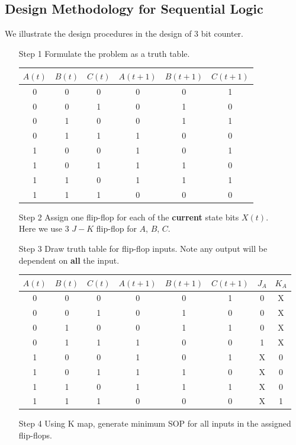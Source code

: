 \documentclass[12pt]{article}
\theoremstyle{definition}
\begin{document}
\subsection{Design Methodology for Sequential Logic}
We illustrate the design procedures in the design of 3 bit counter.
\begin{itemize}
  \item[Step 1]Formulate the problem as a truth table.
  \begin{table}[h]
  \centering
  \begin{tabular}{|c|c|c||c|c|c|}
  \hline
  $A(t)$&$B(t)$&$C(t)$&$A(t+1)$&$B(t+1)$&$C(t+1)$\\\hline
  0&0&0&0&0&1\\\hline
  0&0&1&0&1&0\\\hline
  0&1&0&0&1&1\\\hline
  0&1&1&1&0&0\\\hline
  1&0&0&1&0&1\\\hline
  1&0&1&1&1&0\\\hline
  1&1&0&1&1&1\\\hline
  1&1&1&0&0&0\\\hline
  \end{tabular}
  \end{table}
  \item[Step 2]Assign one flip-flop for each of the \textbf{current} state bits $X(t)$.\\Here we use 3 $J-K$ flip-flop for $A$, $B$, $C$.
  \item[Step 3]Draw truth table for flip-flop inputs. Note any output will be dependent on \textbf{all} the input.\clearpage
  \begin{table}[h]
  \centering
  \begin{tabular}{|c|c|c||c|c|c|c|c|}
  \hline
  $A(t)$&$B(t)$&$C(t)$&$A(t+1)$&$B(t+1)$&$C(t+1)$&$J_A$&$K_A$\\\hline
  0&0&0&0&0&1&0&X\\\hline
  0&0&1&0&1&0&0&X\\\hline
  0&1&0&0&1&1&0&X\\\hline
  0&1&1&1&0&0&1&X\\\hline
  1&0&0&1&0&1&X&0\\\hline
  1&0&1&1&1&0&X&0\\\hline
  1&1&0&1&1&1&X&0\\\hline
  1&1&1&0&0&0&X&1\\\hline
  \end{tabular}
  \end{table}
    \item[Step 4] Using K map, generate minimum SOP for all inputs in the assigned flip-flops.\\

\end{itemize}
\end{document}
